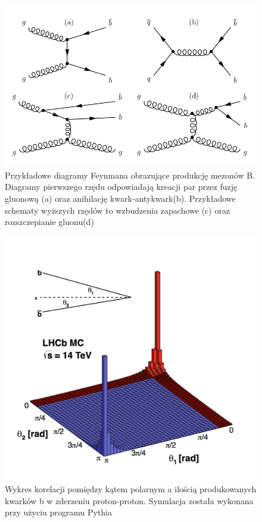 \begin{figure}[h]
  \centering
  \includegraphics[scale=0.5]{rozdzial2/Feynman.png}
  \caption{Przykładowe diagramy Feynmana obrazujące produkcję mezonów B. Diagramy pierwszego rzędu odpowiadają kreacji par przez fuzję gluonową (a) oraz anihilację kwark-antykwark(b). Przykładowe schematy wyższych rzędów to wzbudzenia zapachowe (c) oraz rozszczepianie gluonu(d)}
  \label{fig:feynman}
\end{figure}



\begin{figure}[h]
  \centering
  \includegraphics[scale=0.7]{rozdzial2/pythia.jpg}
  \caption{Wykres korelacji pomiędzy kątem polarnym a ilością produkowanych kwarków b w zderzeniu proton-proton. Symulacja została wykonana przy użyciu programu Pythia \cite{public}}
  \label{fig:pythia}
\end{figure}

